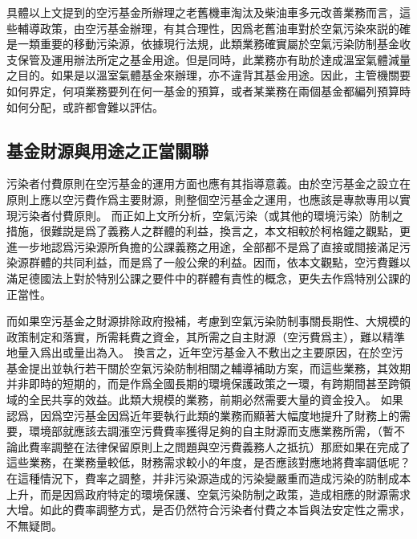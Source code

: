 \documentclass[12pt,a4paper]{article}
\begin{document}
具體以上文提到的空污基金所辦理之老舊機車淘汰及柴油車多元改善業務而言，這些輔導政策，由空污基金辦理，有其合理性，因爲老舊油車對於空氣污染來説的確是一類重要的移動污染源，依據現行法規，此類業務確實屬於空氣污染防制基金收支保管及運用辦法所定之基金用途。但是同時，此業務亦有助於達成溫室氣體減量之目的。如果是以溫室氣體基金來辦理，亦不違背其基金用途。因此，主管機關要如何界定，何項業務要列在何一基金的預算，或者某業務在兩個基金都編列預算時如何分配，或許都會難以評估。

\subsection{基金財源與用途之正當關聯}

污染者付費原則在空污基金的運用方面也應有其指導意義。由於空污基金之設立在原則上應以空污費作爲主要財源，則整個空污基金之運用，也應該是專款專用以實現污染者付費原則。
而正如上文所分析，空氣污染（或其他的環境污染）防制之措施，很難説是爲了義務人之群體的利益，換言之，本文相較於柯格鐘之觀點，更進一步地認爲污染源所負擔的公課義務之用途，全部都不是爲了直接或間接滿足污染源群體的共同利益，而是爲了一般公衆的利益。因而，依本文觀點，空污費難以滿足德國法上對於特別公課之要件中的群體有責性的概念，更失去作爲特別公課的正當性。



而如果空污基金之財源排除政府撥補，考慮到空氣污染防制事關長期性、大規模的政策制定和落實，所需耗費之資金，其所需之自主財源（空污費爲主），難以精準地量入爲出或量出為入。
換言之，近年空污基金入不敷出之主要原因，在於空污基金提出並執行若干關於空氣污染防制相關之輔導補助方案，而這些業務，其效期并非即時的短期的，而是作爲全國長期的環境保護政策之一環，有跨期間甚至跨領域的全民共享的效益。此類大規模的業務，前期必然需要大量的資金投入。
如果認爲，因爲空污基金因爲近年要執行此類的業務而顯著大幅度地提升了財務上的需要，環境部就應該去調漲空污費費率獲得足夠的自主財源而支應業務所需，（暫不論此費率調整在法律保留原則上之問題與空污費義務人之抵抗）那麽如果在完成了這些業務，在業務量較低，財務需求較小的年度，是否應該對應地將費率調低呢？在這種情況下，費率之調整，并非污染源造成的污染變嚴重而造成污染的防制成本上升，而是因爲政府特定的環境保護、空氣污染防制之政策，造成相應的財源需求大增。如此的費率調整方式，是否仍然符合污染者付費之本旨與法安定性之需求，不無疑問。
\end{document}
